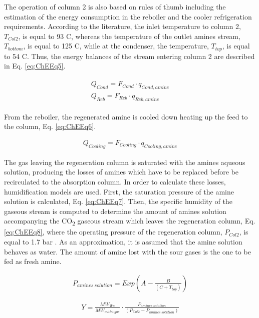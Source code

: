 \begin{refsection}[referencesCh7]
The operation of column 2 is also based on rules of thumb \citep{2012gpsa, 2004gpsa} including the estimation of the energy consumption in the reboiler and the cooler refrigeration requirements. According to the literature, the inlet temperature to column 2, $T_{Col2}$, is equal to 93 \textdegree C, whereas the temperature of the outlet amines stream, $T_{bottom}$, is equal to 125 \textdegree C, while at the condenser, the temperature, $T_{top}$, is equal to 54 \textdegree C. Thus, the energy balances of the stream entering column 2 are described in Eq. \ref{eq:ChEEq5}.

\begin{align}
\begin{array}{l} Q_{Cond} = F_{Cond} \cdot q_{Cond,amine} \\ Q_{Reb} = F_{Reb} \cdot q_{Reb,amine}\end{array} \label{eq:ChEEq5}
\end{align}

From the reboiler, the regenerated amine is cooled down heating up the feed to the column, Eq. \ref{eq:ChEEq6}.

\begin{align}
Q_{Cooling} = F_{Cooling} \cdot q_{Cooling,amine} \label{eq:ChEEq6}
\end{align}

The gas leaving the regeneration column is saturated with the amines aqueous solution, producing the losses of amines which have to be replaced before be recirculated to the absorption column. In order to calculate these losses, humidification models are used. First, the saturation pressure of the amine solution is calculated, Eq. \ref{eq:ChEEq7}. Then, the specific humidity of the gaseous stream is computed to determine the amount of amines solution accompanying the CO\textsubscript{2} gaseous stream which leaves the regeneration column, Eq. \ref{eq:ChEEq8}, where the operating pressure of the regeneration column, $P_{Col2}$, is equal to 1.7 bar \citep{2004gpsa}. As an approximation, it is assumed that the amine solution behaves as water. The amount of amine lost with the sour gases is the one to be fed as fresh amine.

\begin{align}
P_{amines \ solution} = Exp \left( A - \frac{B}{\left( C + {T}_{top} \right)} \right) \label{eq:ChEEq7}
\end{align}

\begin{align}
Y = \frac{MW_{Wa}}{MW_{outlet \ gas}} \cdot \frac{P_{amines \ solution}}{\left( P_{Col2} - P_{amines \ solution} \right)} \label{eq:ChEEq8}
\end{align}


\end{refsection}
